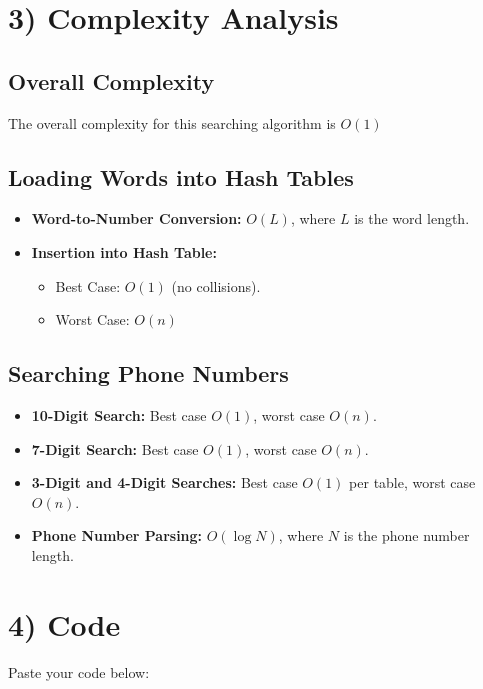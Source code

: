 \documentclass{article}
\begin{document}
\section*{3) Complexity Analysis}
\subsection*{Overall Complexity}
The overall complexity for this searching algorithm is \(O(1)\)

\subsection*{Loading Words into Hash Tables}
\begin{itemize}
    \item \textbf{Word-to-Number Conversion:} \(O(L)\), where \(L\) is the word length.
    \item \textbf{Insertion into Hash Table:}
        \begin{itemize}
            \item Best Case: \(O(1)\) (no collisions).
            \item Worst Case: \(O(n)\)
        \end{itemize}
\end{itemize}

\subsection*{Searching Phone Numbers}
\begin{itemize}
    \item \textbf{10-Digit Search:} Best case \(O(1)\), worst case \(O(n)\).
    \item \textbf{7-Digit Search:} Best case \(O(1)\), worst case \(O(n)\).
    \item \textbf{3-Digit and 4-Digit Searches:} Best case \(O(1)\) per table, worst case \(O(n)\).
    \item \textbf{Phone Number Parsing:} \(O(\log N)\), where \(N\) is the phone number length.
\end{itemize}

\section*{4) Code}

Paste your code below:


\end{document}
